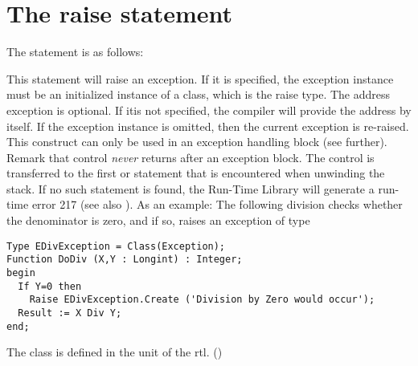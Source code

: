 \documentclass{report}
\begin{document}
\section{The raise statement}
The  statement is as follows:

This statement will raise an exception. If it is specified, the exception
instance must be an initialized instance of a class, which is the raise
type. The address exception is optional. If itis not specified, the compiler
will provide the address by itself.
If the exception instance is omitted, then the current exception is
re-raised. This construct can only be used in an exception handling
block (see further).
Remark that control {\em never} returns after an exception block. The
control is transferred to the first  or
 statement that is encountered when unwinding the stack.
If no such statement is found, the \fpc Run-Time Library will generate a
run-time error 217 (see also ).
As an example: The following division checks whether the denominator is
zero, and if so, raises an exception of type 
\begin{verbatim}
Type EDivException = Class(Exception);
Function DoDiv (X,Y : Longint) : Integer;
begin
  If Y=0 then
    Raise EDivException.Create ('Division by Zero would occur');
  Result := X Div Y;
end;
\end{verbatim}
The class  is defined in the  unit of the rtl.
()
\end{document}
